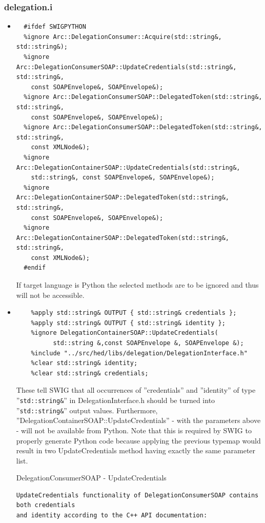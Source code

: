 \documentclass{article}
\begin{document}
\subsubsection{delegation.i}
\label{idelegation}
\begin{flushleft}
\begin{itemize}
  \item{ \begin{verbatim}
  #ifdef SWIGPYTHON
  %ignore Arc::DelegationConsumer::Acquire(std::string&, std::string&);
  %ignore Arc::DelegationConsumerSOAP::UpdateCredentials(std::string&, std::string&, 
    const SOAPEnvelope&, SOAPEnvelope&);
  %ignore Arc::DelegationConsumerSOAP::DelegatedToken(std::string&, std::string&, 
    const SOAPEnvelope&, SOAPEnvelope&);
  %ignore Arc::DelegationConsumerSOAP::DelegatedToken(std::string&, std::string&, 
    const XMLNode&);
  %ignore Arc::DelegationContainerSOAP::UpdateCredentials(std::string&, 
    std::string&, const SOAPEnvelope&, SOAPEnvelope&);
  %ignore Arc::DelegationContainerSOAP::DelegatedToken(std::string&, std::string&, 
    const SOAPEnvelope&, SOAPEnvelope&);
  %ignore Arc::DelegationContainerSOAP::DelegatedToken(std::string&, std::string&, 
    const XMLNode&);
  #endif
  \end{verbatim}
  If target language is Python the selected methods are to be ignored and thus 
  will not be accessible.
  }
\end{itemize}
\begin{itemize}
  \item{ \begin{verbatim}
    %apply std::string& OUTPUT { std::string& credentials };
    %apply std::string& OUTPUT { std::string& identity };
    %ignore DelegationContainerSOAP::UpdateCredentials(
          std::string &,const SOAPEnvelope &, SOAPEnvelope &);
    %include "../src/hed/libs/delegation/DelegationInterface.h"
    %clear std::string& identity;
    %clear std::string& credentials;
  \end{verbatim}
  These tell SWIG that all occurrences of ''credentials'' and ''identity'' of type 
  ''\verb$std::string&$'' in DelegationInterface.h should be turned into 
  ''\verb$std::string&$'' output values.
  Furthermore, ''DelegationContainerSOAP::UpdateCredentials'' - with the parameters above - 
  will not be available from Python.
  Note that this is required by SWIG to properly generate Python code because applying the 
  previous typemap would result in two UpdateCredentials method having exactly the same parameter list.
    \begin{example}
      \caption{DelegationConsumerSOAP - UpdateCredentials}\label{dcsucex}
\begin{verbatim}
UpdateCredentials functionality of DelegationConsumerSOAP contains both credentials
and identity according to the C++ API documentation:


\end{verbatim}
\end{example}}
\end{itemize}
\end{flushleft}
\end{document}
